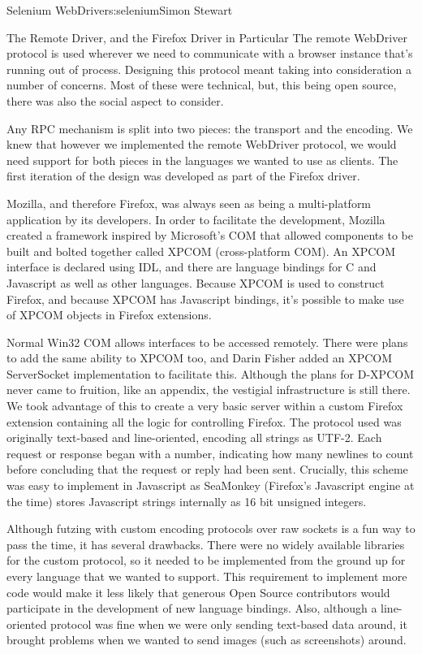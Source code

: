 \begin{aosachapter}{Selenium WebDriver}{s:selenium}{Simon Stewart}
\begin{aosasect1}{The Remote Driver, and the Firefox Driver in Particular}
The remote WebDriver protocol is used wherever we need to communicate
with a browser instance that's running out of process.  Designing this
protocol meant taking into consideration a number of concerns. Most of
these were technical, but, this being open source, there was also the
social aspect to consider.

Any RPC mechanism is split into two pieces: the transport and the
encoding. We knew that however we implemented the remote WebDriver
protocol, we would need support for both pieces in the languages we
wanted to use as clients. The first iteration of the design was
developed as part of the Firefox driver.

Mozilla, and therefore Firefox, was always seen as being a
multi-platform application by its developers. In order to facilitate
the development, Mozilla created a framework inspired by Microsoft's
COM that allowed components to be built and bolted together called
XPCOM (cross-platform COM). An XPCOM interface is declared using IDL,
and there are
language bindings for C and Javascript as well as other languages. Because
XPCOM is used to construct Firefox, and because XPCOM has Javascript
bindings, it's possible to make use of XPCOM objects in Firefox
extensions.

Normal Win32 COM allows interfaces to be accessed remotely. There were
plans to add the same ability to XPCOM too, and Darin Fisher added an
XPCOM ServerSocket implementation to facilitate this. Although the
plans for D-XPCOM never came to fruition, like an appendix, the
vestigial infrastructure is still there.  We took advantage of this to
create a very basic server within a custom Firefox extension
containing all the logic for controlling Firefox. The protocol used
was originally text-based and line-oriented, encoding all strings as
UTF-2. Each request or response began with a number, indicating how
many newlines to count before concluding that the request or reply had
been sent. Crucially, this scheme was easy to implement in Javascript
as SeaMonkey (Firefox's Javascript engine at the time) stores
Javascript strings internally as 16 bit unsigned integers.

Although futzing with custom encoding protocols over raw sockets is a
fun way to pass the time, it has several drawbacks. There were no
widely available libraries for the custom protocol, so it needed to be
implemented from the ground up for every language that we wanted to
support. This requirement to implement more code would make it less
likely that generous Open Source contributors would participate in the
development of new language bindings. Also, although a line-oriented
protocol was fine when we were only sending text-based data around, it
brought problems when we wanted to send images (such as screenshots)
around.


\end{aosasect1}
\end{aosachapter}
